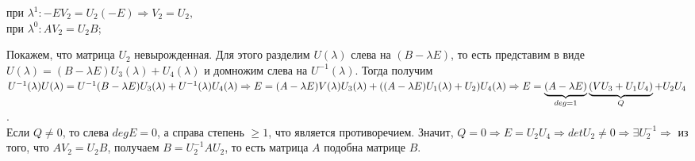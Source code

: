 \begin{Proof}
\begin{center}
		при $\lambda^1 : -EV_2 = U_2(-E)\Rightarrow V_2 = U_2,$\\
		при $\lambda^0 : AV_2 = U_2 B$;
	\end{center}
	Покажем, что матрица $U_2$ невырожденная. Для этого разделим $U(\lambda)$ слева на $(B-\lambda E)$, то есть представим в виде
	$U(\lambda) = (B-\lambda E) U_3(\lambda) + U_4(\lambda)$ и домножим слева на $U^{-1}(\lambda)$. Тогда получим
	$U^{-1}(\lambda)U(\lambda) = U^{-1}(B-\lambda E) U_3(\lambda) + U^{-1}(\lambda)U_4(\lambda)\Rightarrow\\ E = (A-\lambda E)V(\lambda)U_3(\lambda) + ((A-\lambda E) U_1(\lambda) + U_2) U_4(\lambda)\Rightarrow E = \underbrace{(A-\lambda E)}_{deg=1}\underbrace{(VU_3 + U_1 U_4)}_{Q} + U_2 U_4$.\\ Если $Q\ne 0$, то слева $degE = 0$, а справа степень $\geqslant 1$, что является противоречием. Значит, $Q= 0\Rightarrow E = U_2U_4\Rightarrow det U_2 \ne 0\Rightarrow\exists U_2^{-1}\Rightarrow$ из того, что $AV_2 = U_2 B$, получаем $B = U_2^{-1}AU_2$, то есть матрица $A$ подобна матрице $B.$
\end{Proof}






